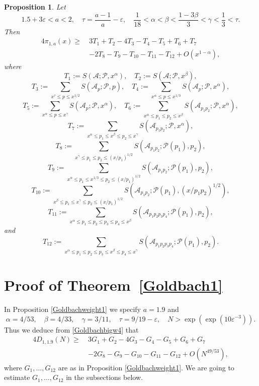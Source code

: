 \documentclass[12pt, a4paper]{amsart}
\def\leq{\leqslant}
\def\geq{\geqslant}
\def\le{\leqslant}
\def\ge{\geqslant}
\theoremstyle{plain}
\newtheorem{proposition}{Proposition}[section]
\theoremstyle{remark}
\numberwithin{equation}{section}
\begin{document}
\begin{proposition}\label{Twinweight}
Let 
$$
1.5+3\varepsilon<a<2,\quad \tau=\dfrac{a-1}{a}-\varepsilon, \quad \dfrac{1}{18}<\alpha<\beta<\dfrac{1-3\beta}{3}<\gamma< \dfrac{1}{3}<\tau.  
$$ 
Then
\begin{equation}\label{Twinweight4}
\begin{split}
4\pi_{1,a}(x) 
\ge\ & 3T_1 + T_2 -4T_3- T_4- T_5 + T_6 + T_7 \\
&- 2T_8 - T_9 - T_{10} - T_{11} - T_{12} + O(x^{1 - \alpha}),
\end{split}
\end{equation}
where
\[
T_1 := S(\mathscr{A}; \mathscr{P}, x^{\alpha}), \quad 
T_2 := S(\mathscr{A}; \mathscr{P}, x^{\beta}),
\] 
\[
T_3 :=\sum\limits_{x^\tau\le p\le x^{1/2}}S(\mathscr{A}_p ; \mathscr{P}, p), 
\quad 
T_4 := \sum_{x^{\alpha} \leq p \le x^{1/3}} S(\mathscr{A}_p; \mathscr{P}, x^{\alpha}),
\]
\[
T_5 := \sum_{x^{\alpha} \leq p \le x^{\gamma}} S(\mathscr{A}_p; \mathscr{P}, x^{\alpha}), 
\quad 
T_6 := \sum_{x^{\alpha} \leq p_1 \le p_2 \le x^{\beta}} S(\mathscr{A}_{p_1 p_2}; \mathscr{P}, x^{\alpha}), 
\] 
\[
T_7 := \sum_{x^{\alpha} \leq p_1 \le x^{\beta} \le p_2 \le x^{\gamma}} S(\mathscr{A}_{p_1 p_2}; \mathscr{P}, x^{\alpha}), 
\]
\[
T_8 := \sum_{x^{\gamma} \leq p_1 \le p_2 \le (x/p_1)^{1/2}} S(\mathscr{A}_{p_1 p_2}; \mathscr{P}(p_1), p_2),
\]
\[
T_9 := \sum_{x^{\alpha} \leq p_1 \le x^{1/3} \leq p_2 \le (x/p_1)^{1/2}} S(\mathscr{A}_{p_1 p_2}; \mathscr{P}(p_1), p_2),
\] 
\[ 
T_{10} := \sum_{x^{\beta} \leq p_1 \le x^{\gamma} \leq p_2 \le (x/p_1)^{1/2}} S(\mathscr{A}_{p_1 p_2}; \mathscr{P}( p_1), (x/p_1 p_2)^{1/2}), 
\] 
\[
T_{11} := \sum_{x^{\alpha} \leq p_1 \le p_2 \le p_3 \le p_4 \le x^{\beta} } S(\mathscr{A}_{p_1 p_2 p_3 p_4}; \mathscr{P}(p_1), p_2),
\] 
and 
\[
T_{12} := \sum_{x^{\alpha} \leq p_1 \le p_2 \le p_3 \le x^{\beta} \leq p_4 \le x^{\gamma}} S(\mathscr{A}_{p_1 p_2 p_3 p_4}; \mathscr{P}(p_1), p_2).
\] 
\end{proposition}

\section{Proof of Theorem~\ref{Goldbach1}}\label{sec5}

In Proposition \ref{Goldbachweight1} we specify $a=1.9$ and 
\begin{equation}\label{Cond/Goldbig}
\alpha=4/53,\quad \beta=4/33,\quad \gamma=3/11,\quad \tau=9/19-\varepsilon,\quad N>\exp(\exp(10\varepsilon^{-3})). 
\end{equation} 
Thus we deduce from \eqref{Goldbachbigw4} that 
\begin{equation}\label{GoldbachBigw4}
	\begin{split}
	4D_{1,1.9}(N) 
	\geq\ &3G_1 + G_2 -4G_3- G_4- G_5 + G_6 + G_7 \\
	&- 2G_8 - G_9 - G_{10} - G_{11} - G_{12} + O(N^{49/53}),
	\end{split}
	\end{equation}
where $G_1, \ldots, G_{12}$ are as in Proposition \ref{Goldbachweight1}. We are going to estimate $G_1, \ldots, G_{12}$ 
in the subsections below. 
	
\end{document}

